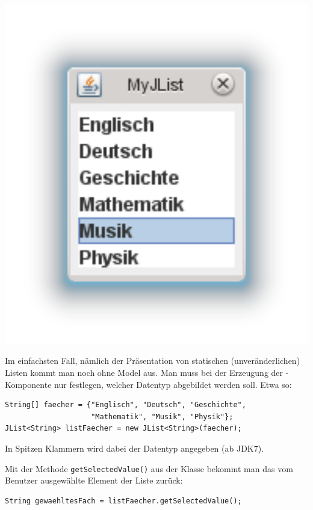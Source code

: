 \begin{minipage}{0.35\textwidth}
\includegraphics[width=1.0\textwidth]{./inf/SEKII/24_Java_GUI-Komponenten/JList.png}
\end{minipage}
\begin{minipage}{0.65\textwidth}
Im einfachsten Fall, nämlich der Präsentation von statischen (unveränderlichen)
Listen kommt man noch ohne Model aus. Man muss bei der Erzeugung der
-Komponente nur festlegen, welcher Datentyp abgebildet werden
soll. Etwa so:

\begin{lstlisting}
String[] faecher = {"Englisch", "Deutsch", "Geschichte", 
                    "Mathematik", "Musik", "Physik"};
JList<String> listFaecher = new JList<String>(faecher);
\end{lstlisting}

In Spitzen Klammern wird dabei der Datentyp angegeben (ab JDK7).

Mit der Methode \lstinline|getSelectedValue()| aus der Klasse 
bekommt man das vom Benutzer ausgewählte Element der Liste zurück:

\begin{lstlisting}
String gewaehltesFach = listFaecher.getSelectedValue();
\end{lstlisting}
\end{minipage}


